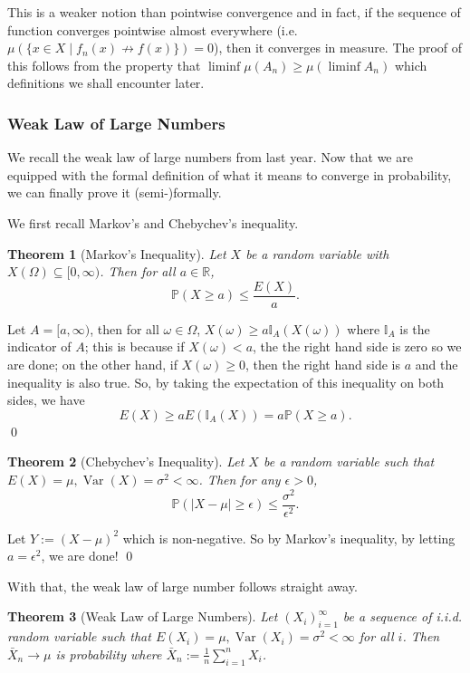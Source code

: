 \documentclass[
]{article}
\newtheorem{theorem}{Theorem}
\theoremstyle{definition}
\begin{document}
This is a weaker notion than pointwise convergence and in fact, if the
sequence of function converges pointwise almost everywhere
(i.e.~\(\mu(\{x \in X \mid f_n(x) \not\to f(x)\}) = 0\)), then it
converges in measure. The proof of this follows from the property that
\(\liminf \mu(A_n) \ge \mu(\liminf A_n)\) which definitions we shall
encounter later.

\hypertarget{weak-law-of-large-numbers}{%
\subsubsection{Weak Law of Large
Numbers}\label{weak-law-of-large-numbers}}

We recall the weak law of large numbers from last year. Now that we are
equipped with the formal definition of what it means to converge in
probability, we can finally prove it (semi-)formally.

We first recall Markov's and Chebychev's inequality.

\begin{theorem}[Markov's Inequality]
  Let \(X\) be a random variable with \(X(\Omega) \subseteq [0, \infty)\). Then 
  for all \(a \in \mathbb{R}\),
  \[\mathbb{P}(X \ge a) \le \frac{E(X)}{a}.\]
\end{theorem}
\proof

Let \(A = [a, \infty)\), then for all \(\omega \in \Omega\),
\(X(\omega) \ge a\mathbb{I}_A(X(\omega))\) where \(\mathbb{I}_A\) is the
indicator of \(A\); this is because if \(X(\omega) < a\), the the right
hand side is zero so we are done; on the other hand, if
\(X(\omega) \ge 0\), then the right hand side is \(a\) and the
inequality is also true. So, by taking the expectation of this
inequality on both sides, we have
\[E(X) \ge a E(\mathbb{I}_A(X)) = a \mathbb{P}(X \ge a).\] \qed

\begin{theorem}[Chebychev's Inequality]
  Let \(X\) be a random variable such that \(E(X) = \mu, \mathop{\mathrm{Var}}(X) = \sigma ^2 < \infty\).
  Then for any \(\epsilon > 0\),
  \[\mathbb{P}(\left|X - \mu \right| \ge \epsilon) \le \frac{\sigma ^2}{\epsilon^2}.\]
\end{theorem}
\proof

Let \(Y := (X - \mu)^2\) which is non-negative. So by Markov's
inequality, by letting \(a = \epsilon ^2\), we are done! \qed

With that, the weak law of large number follows straight away.

\begin{theorem}[Weak Law of Large Numbers]
  Let \((X_i)_{i = 1}^\infty\) be a sequence of i.i.d. random variable such that 
  \(E(X_i) = \mu, \mathop{\mathrm{Var}}(X_i) = \sigma ^2 < \infty\) for all \(i\). 
  Then \(\bar{X}_n \to \mu\) is probability where \(\bar{X}_n := 
  \frac{1}{n} \sum_{i = 1}^n X_i\).
\end{theorem}
\proof
\end{document}
